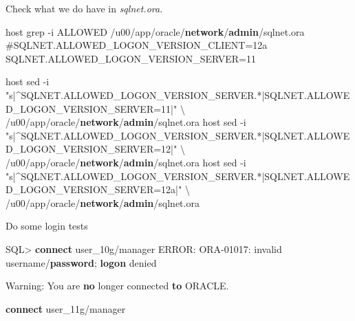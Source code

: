 \documentclass[a4paper,,tablecaptionabove]{scrartcl}
\newenvironment{Shaded}{}{}
\newcommand{\DecValTok}[1]{\textcolor[rgb]{0.25,0.63,0.44}{#1}}
\newcommand{\KeywordTok}[1]{\textcolor[rgb]{0.00,0.44,0.13}{\textbf{#1}}}
\newcommand{\NormalTok}[1]{#1}
\newcommand{\OperatorTok}[1]{\textcolor[rgb]{0.40,0.40,0.40}{#1}}
\newcommand{\OtherTok}[1]{\textcolor[rgb]{0.00,0.44,0.13}{#1}}
\begin{document}
Check what we do have in \emph{sqlnet.ora}.

\begin{Shaded}
\begin{Highlighting}[]
\NormalTok{host grep }\OperatorTok{-}\NormalTok{i ALLOWED }\OperatorTok{/}\NormalTok{u00}\OperatorTok{/}\NormalTok{app}\OperatorTok{/}\NormalTok{oracle}\OperatorTok{/}\KeywordTok{network}\OperatorTok{/}\KeywordTok{admin}\OperatorTok{/}\NormalTok{sqlnet.ora}
\NormalTok{#SQLNET.ALLOWED_LOGON_VERSION_CLIENT}\OperatorTok{=}\NormalTok{12a}
\NormalTok{SQLNET.ALLOWED_LOGON_VERSION_SERVER}\OperatorTok{=}\DecValTok{11}

\NormalTok{host sed }\OperatorTok{-}\NormalTok{i }\OtherTok{"s|^SQLNET.ALLOWED_LOGON_VERSION_SERVER.*|SQLNET.ALLOWED_LOGON_VERSION_SERVER=11|"}\NormalTok{ \textbackslash{}}
    \OperatorTok{/}\NormalTok{u00}\OperatorTok{/}\NormalTok{app}\OperatorTok{/}\NormalTok{oracle}\OperatorTok{/}\KeywordTok{network}\OperatorTok{/}\KeywordTok{admin}\OperatorTok{/}\NormalTok{sqlnet.ora}
\NormalTok{host sed }\OperatorTok{-}\NormalTok{i }\OtherTok{"s|^SQLNET.ALLOWED_LOGON_VERSION_SERVER.*|SQLNET.ALLOWED_LOGON_VERSION_SERVER=12|"}\NormalTok{ \textbackslash{}}
    \OperatorTok{/}\NormalTok{u00}\OperatorTok{/}\NormalTok{app}\OperatorTok{/}\NormalTok{oracle}\OperatorTok{/}\KeywordTok{network}\OperatorTok{/}\KeywordTok{admin}\OperatorTok{/}\NormalTok{sqlnet.ora}
\NormalTok{host sed }\OperatorTok{-}\NormalTok{i }\OtherTok{"s|^SQLNET.ALLOWED_LOGON_VERSION_SERVER.*|SQLNET.ALLOWED_LOGON_VERSION_SERVER=12a|"}\NormalTok{ \textbackslash{}}
    \OperatorTok{/}\NormalTok{u00}\OperatorTok{/}\NormalTok{app}\OperatorTok{/}\NormalTok{oracle}\OperatorTok{/}\KeywordTok{network}\OperatorTok{/}\KeywordTok{admin}\OperatorTok{/}\NormalTok{sqlnet.ora}
\end{Highlighting}
\end{Shaded}

Do some login tests

\begin{Shaded}
\begin{Highlighting}[]
\NormalTok{SQL}\OperatorTok{>} \KeywordTok{connect}\NormalTok{ user_10g}\OperatorTok{/}\NormalTok{manager}
\NormalTok{ERROR:}
\NormalTok{ORA}\OperatorTok{-}\DecValTok{01017}\NormalTok{: invalid username}\OperatorTok{/}\KeywordTok{password}\NormalTok{; }\KeywordTok{logon}\NormalTok{ denied}


\NormalTok{Warning: You are }\KeywordTok{no}\NormalTok{ longer connected }\KeywordTok{to}\NormalTok{ ORACLE.}

\KeywordTok{connect}\NormalTok{ user_11g}\OperatorTok{/}\NormalTok{manager}
\end{Highlighting}
\end{Shaded}
\end{document}

